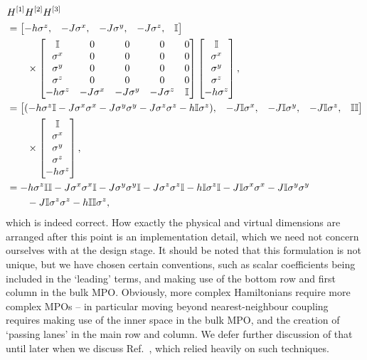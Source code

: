  \begin{align}
 	&H^{[1]}H^{[2]}H^{[3]} \notag \\ 
 	&= \begin{bmatrix} -h\sigma^{z}, & -J\sigma^{x}, & -J\sigma^{y}, & -J\sigma^{z}, & \mathbb{I} \end{bmatrix} \notag \\
 	&\qquad \times  
 							\begin{bmatrix} \mathbb{I} & 0 & 0 & 0 & 0 \\
 										   \sigma^{x} & 0 & 0 & 0 & 0 \\
 										   \sigma^{y} & 0 & 0 & 0 & 0 \\
 										   \sigma^{z} & 0 & 0 & 0 & 0 \\
 										    -h\sigma^{z} & -J\sigma^{x} & -J\sigma^{y} & -J\sigma^{z} & \mathbb{I}
 							\end{bmatrix}
 							\begin{bmatrix} \mathbb{I} \\ \sigma^{x} \\ \sigma^{y} \\ \sigma^{z} \\ -h\sigma^{z} \end{bmatrix}, \notag \\
 	&= \begin{bmatrix} (-h\sigma^{z}\mathbb{I} - J\sigma^{x}\sigma^{x} - J\sigma^{y}\sigma^{y} - J\sigma^{z}\sigma^{z} - h\mathbb{I}\sigma^{z}), & -J\mathbb{I}\sigma^{x}, & -J\mathbb{I}\sigma^{y}, & -J\mathbb{I}\sigma^{z}, & \mathbb{I}\mathbb{I} \end{bmatrix} \notag \\
 	&\qquad \times \begin{bmatrix} \mathbb{I} \\ \sigma^{x} \\ \sigma^{y} \\ \sigma^{z} \\ -h\sigma^{z} \end{bmatrix}, \notag \\
 	&= -h\sigma^{z}\mathbb{I}\mathbb{I} - J\sigma^{x}\sigma^{x}\mathbb{I} - J\sigma^{y}\sigma^{y}\mathbb{I} - J\sigma^{z}\sigma^{z}\mathbb{I} - h\mathbb{I}\sigma^{z}\mathbb{I} - J \mathbb{I}\sigma^{x}\sigma^{x} -  J \mathbb{I}\sigma^{y}\sigma^{y} \notag \\ 
 	&\qquad - J \mathbb{I}\sigma^{z}\sigma^{z} - h \mathbb{I}\mathbb{I}\sigma^{z},
 	\label{eq:mpo1-5}
 \end{align}
 which is indeed correct. How exactly the physical and virtual dimensions are arranged after this point is an implementation detail, which we need not concern ourselves with at the design stage. It should be noted that this formulation is not unique, but we have chosen certain conventions, such as scalar coefficients being included in the `leading' terms, and making use of the bottom row and first column in the bulk MPO. Obviously, more complex Hamiltonians require more complex MPOs -- in particular moving beyond nearest-neighbour coupling requires making use of the inner space in the bulk MPO, and the creation of `passing lanes' in the main row and column. We defer further discussion of that until later when we discuss Ref.~\cite{OBH17}, which relied heavily on such techniques. 
 
